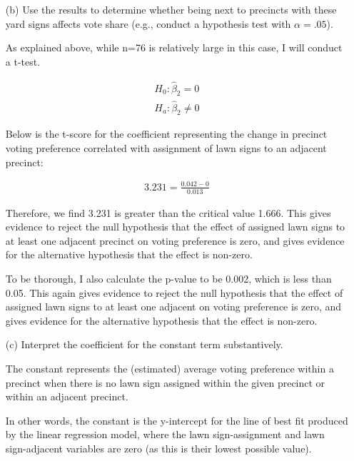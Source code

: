 \documentclass[12pt,letterpaper]{article}
\begin{document}
\begin{enumerate}
		
	
	\newpage		
	\item [(b)]  Use the results to determine whether being
	next to precincts with these yard signs affects vote
	share (e.g., conduct a hypothesis test with $\alpha = .05$).
	
	\noindent As explained above, while n=76 is relatively large in this case, I will conduct a t-test.
	
	\begin{align*}
		H_0: \hat \beta_2 = 0\\
		H_a: \hat \beta_2 \neq 0
	\end{align*}
	
	\noindent Below is the t-score for the coefficient representing the change in precinct voting preference correlated with assignment of lawn signs to an adjacent precinct:
	
	\begin{align*}
		3.231 = \frac{0.042 - 0}{0.013}
	\end{align*}
	
	\noindent Therefore, we find 3.231 is greater than the critical value 1.666. This gives evidence to reject the null hypothesis that the effect of assigned lawn signs to at least one adjacent precinct on voting preference is zero, and gives evidence for the alternative hypothesis that the effect is non-zero.
	
		
	
	\noindent To be thorough, I also calculate the p-value to be 0.002, which is less than 0.05. This again gives evidence to reject the null hypothesis that the effect of assigned lawn signs to at least one adjacent on voting preference is zero, and gives evidence for the alternative hypothesis that the effect is non-zero.
	
	
	
	\item [(c)] Interpret the coefficient for the constant term substantively.
	
	\noindent The constant represents the (estimated) average voting preference within a precinct when there is no lawn sign assigned within the given precinct or within an adjacent precinct.
	
	\noindent In other words, the constant is the y-intercept for the line of best fit produced by the linear regression model, where the lawn sign-assignment and lawn sign-adjacent variables are zero (as this is their lowest possible value).
	

\end{enumerate}
\end{document}
